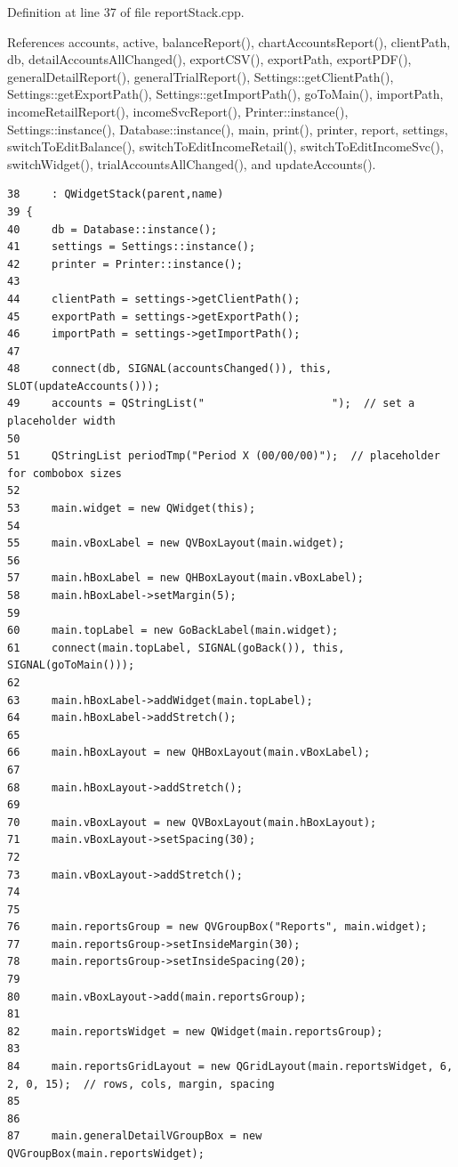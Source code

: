 Definition at line 37 of file report\-Stack.cpp.

References accounts, active, balance\-Report(), chart\-Accounts\-Report(), client\-Path, db, detail\-Accounts\-All\-Changed(), export\-CSV(), export\-Path, export\-PDF(), general\-Detail\-Report(), general\-Trial\-Report(), Settings::get\-Client\-Path(), Settings::get\-Export\-Path(), Settings::get\-Import\-Path(), go\-To\-Main(), import\-Path, income\-Retail\-Report(), income\-Svc\-Report(), Printer::instance(), Settings::instance(), Database::instance(), main, print(), printer, report, settings, switch\-To\-Edit\-Balance(), switch\-To\-Edit\-Income\-Retail(), switch\-To\-Edit\-Income\-Svc(), switch\-Widget(), trial\-Accounts\-All\-Changed(), and update\-Accounts().

\footnotesize\begin{verbatim}38     : QWidgetStack(parent,name)
39 {
40     db = Database::instance();
41     settings = Settings::instance();
42     printer = Printer::instance();
43 
44     clientPath = settings->getClientPath();
45     exportPath = settings->getExportPath();
46     importPath = settings->getImportPath();
47     
48     connect(db, SIGNAL(accountsChanged()), this, SLOT(updateAccounts()));
49     accounts = QStringList("                    ");  // set a placeholder width
50 
51     QStringList periodTmp("Period X (00/00/00)");  // placeholder for combobox sizes
52     
53     main.widget = new QWidget(this);
54     
55     main.vBoxLabel = new QVBoxLayout(main.widget);
56     
57     main.hBoxLabel = new QHBoxLayout(main.vBoxLabel);
58     main.hBoxLabel->setMargin(5);
59     
60     main.topLabel = new GoBackLabel(main.widget);
61     connect(main.topLabel, SIGNAL(goBack()), this, SIGNAL(goToMain()));
62     
63     main.hBoxLabel->addWidget(main.topLabel);
64     main.hBoxLabel->addStretch();
65     
66     main.hBoxLayout = new QHBoxLayout(main.vBoxLabel);
67     
68     main.hBoxLayout->addStretch();
69     
70     main.vBoxLayout = new QVBoxLayout(main.hBoxLayout);
71     main.vBoxLayout->setSpacing(30);
72     
73     main.vBoxLayout->addStretch();
74     
75     
76     main.reportsGroup = new QVGroupBox("Reports", main.widget);
77     main.reportsGroup->setInsideMargin(30);
78     main.reportsGroup->setInsideSpacing(20);
79     
80     main.vBoxLayout->add(main.reportsGroup);
81     
82     main.reportsWidget = new QWidget(main.reportsGroup);
83     
84     main.reportsGridLayout = new QGridLayout(main.reportsWidget, 6, 2, 0, 15);  // rows, cols, margin, spacing
85     
86     
87     main.generalDetailVGroupBox = new QVGroupBox(main.reportsWidget);

\end{verbatim}
